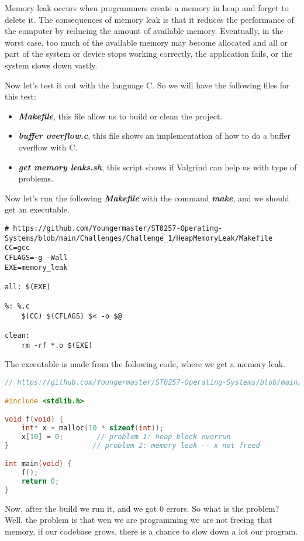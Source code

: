 Memory leak occurs when programmers create a memory in heap and forget to delete it. The
consequences of memory leak is that it reduces the performance of the computer by reducing the
amount of available memory. Eventually, in the worst case, too much of the available memory may
become allocated and all or part of the system or device stops working correctly, the application
fails, or the system slows down vastly.

Now let's test it out with the language C. So we will have the following files for this test:

\begin{itemize}
    \item \textit{\textbf{Makefile}}, this file allow us to build or clean the project.
    \item \textit{\textbf{buffer overflow.c}}, this file shows an implementation of how to do a buffer overflow with C.
    \item \textit{\textbf{get memory leaks.sh}}, this script shows if Valgrind can help us with type
    of problems.
\end{itemize}

Now let's run the following \textit{\textbf{Makefile}} with the command \textit{\textbf{make}}, and
we should get an executable.

\begin{lstlisting}[language=Make, caption=This file allow us to build or clean the project.]
# https://github.com/Youngermaster/ST0257-Operating-Systems/blob/main/Challenges/Challenge_1/HeapMemoryLeak/Makefile
CC=gcc
CFLAGS=-g -Wall
EXE=memory_leak

all: $(EXE)

%: %.c
	$(CC) $(CFLAGS) $< -o $@

clean:
	rm -rf *.o $(EXE)
\end{lstlisting}

The executable is made from the following code, where we get a memory leak.

\begin{lstlisting}[language=C, caption=This file shows an implementation of how to do a implement a
    memory leak with C.]
// https://github.com/Youngermaster/ST0257-Operating-Systems/blob/main/Challenges/Challenge_1/HeapMemoryLeak/memory_leak.c

#include <stdlib.h>

void f(void) {
	int* x = malloc(10 * sizeof(int));
	x[10] = 0;        // problem 1: heap block overrun
}                    // problem 2: memory leak -- x not freed

int main(void) {
	f();
	return 0;
}
\end{lstlisting}

Now, after the build we run it, and we got 0 errors. So what is the problem? Well, the problem is
that wen we are programming we are not freeing that memory, if our codebase grows, there is a chance
to slow down a lot our program.




\clearpage